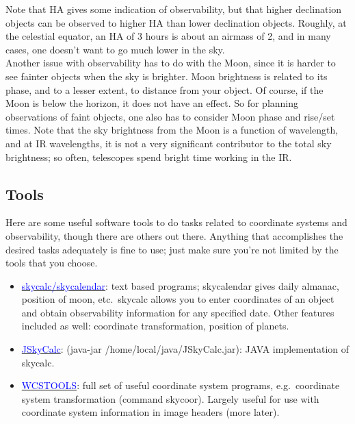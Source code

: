\documentclass[12pt]{article}
\begin{document}
\noindent Note that HA gives some indication of observability, but that
higher declination objects can be observed to higher HA than lower
declination objects. Roughly, at the celestial equator, an HA of 3 hours
is about an airmass of 2, and in many cases, one doesn't want to go much
lower in the sky.\\

\noindent Another issue with observability has to do with the Moon,
since it is harder to see fainter objects when the sky is brighter.
Moon brightness is related to its phase, and to a lesser extent, to
distance from your object. Of course, if the Moon is below the horizon,
it does not have an effect. So for planning observations of faint objects,
one also has to consider Moon phase and rise/set times. Note that the
sky brightness from the Moon is a function of wavelength, and at IR
wavelengths, it is not a very significant contributor to the total sky
brightness; so often, telescopes spend bright time working in the IR.

\subsection*{Tools}
Here are some useful software tools to do tasks related to coordinate systems
and observability, though there are others out there. Anything that
accomplishes the desired tasks adequately is fine to use; just make sure
you're not limited by the tools that you choose.
\begin{itemize}
    \item \href{}{\textcolor{blue}{skycalc/skycalendar}}:
        text based programs; skycalendar gives daily almanac, position of moon,
        etc.\ skycalc allows you to enter coordinates of an object and obtain
        observability information for any specified date. Other features included
        as well: coordinate transformation, position of planets.
    \item \href{}{\textcolor{blue}{JSkyCalc}}:
        (java-jar /home/local/java/JSkyCalc.jar): JAVA implementation
        of skycalc.
    \item \href{}{\textcolor{blue}{WCSTOOLS}}: full set of useful coordinate
        system programs, e.g.\ coordinate system transformation (command skycoor).
        Largely useful for use with coordinate system information in image
        headers (more later).
\end{itemize}
\end{document}
